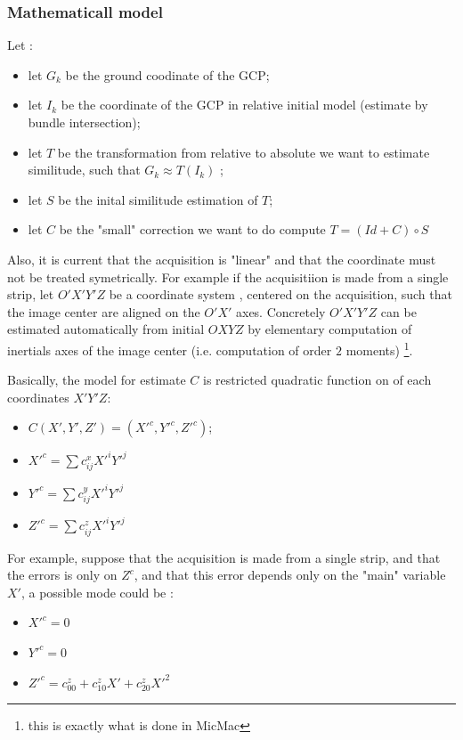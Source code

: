 \subsubsection{Mathematicall model}

Let :

\begin{itemize}
   \item let $G_k$ be the ground coodinate of the GCP;
   \item let $I_k$ be the coordinate of the GCP in relative initial model (estimate by bundle intersection);
   \item let $T$ be the transformation from relative to absolute we want to estimate similitude, such that  $G_k \approx T(I_k)$ ;
   \item let $S$ be the inital similitude estimation of $T$;
   \item let $C$ be the "small" correction we want to do compute $T= (Id+C) \circ S$
\end{itemize}


Also, it is current that the acquisition is "linear" and that the coordinate must not be treated
symetrically. For example if the acquisitiion is made from a single strip, let $O'X'Y'Z$ be a
coordinate system ,  centered on the acquisition, such that the image center are aligned on the $O'X'$ axes.
Concretely $O'X'Y'Z$ can be estimated automatically from initial $OXYZ$ by elementary computation of inertials axes of the
image center (i.e. computation of order $2$ moments) \footnote{this is exactly what is done in MicMac}.



Basically, the model for estimate $C$ is restricted  quadratic function on of  each coordinates $X'Y'Z$:

\begin{itemize}
   \item $C(X',Y',Z') = (X'^c,Y'^c,Z'^c)$;
   \item $X'^c = \sum c^x_{ij} X'^i Y'^j$
   \item $Y'^c = \sum c^y_{ij} X'^i Y'^j$
   \item $Z'^c = \sum c^z_{ij} X'^i Y'^j$
\end{itemize}


For example, suppose that the acquisition is made from a single strip, and
that the errors is only on $Z^c$,  and that this error depends only on  the
"main" variable $X'$, a possible mode could be :

\begin{itemize}
   \item $X'^c = 0$
   \item $Y'^c = 0$
   \item $Z'^c =  c^z_{00} + c^z_{10} X' + c^z_{20} X'^2$
\end{itemize}


